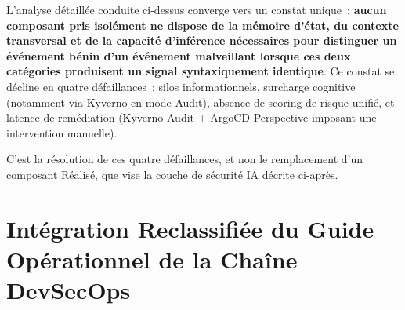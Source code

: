 L'analyse détaillée conduite ci-dessus converge vers un constat unique~: \textbf{aucun composant pris isolément ne dispose de la mémoire d'état, du contexte transversal et de la capacité d'inférence nécessaires pour distinguer un événement bénin d'un événement malveillant lorsque ces deux catégories produisent un signal syntaxiquement identique}. Ce constat se décline en quatre défaillances~: silos informationnels, surcharge cognitive (notamment via Kyverno en mode Audit), absence de scoring de risque unifié, et latence de remédiation (Kyverno Audit + ArgoCD Perspective imposant une intervention manuelle).

C'est la résolution de ces quatre défaillances, et non le remplacement d'un composant Réalisé, que vise la couche de sécurité IA décrite ci-après.


\section{Intégration Reclassifiée du Guide Opérationnel de la Chaîne DevSecOps}
\label{sec:guide_reclasse}


